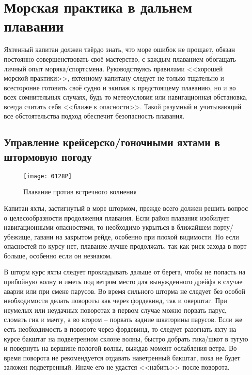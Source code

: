 \chapter{Морская практика в дальнем плавании}

Яхтенный капитан должен твёрдо знать, что море ошибок не прощает, обязан постоянно совершенствовать своё мастерство, с каждым плаванием обогащать личный опыт моряка\-/спортсмена. Руководствуясь правилами <<хорошей морской практики>>, яхтенному капитану следует не только тщательно и всесторонне готовить своё судно и экипаж к предстоящему плаванию, но и во всех сомнительных случаях, будь то метеоусловия или навигационная обстановка, всегда считать себя <<ближе к опасности>>. Такой разумный и учитывающий все обстоятельства подход обеспечит безопасность плавания.

\section{Управление крейсерско\-/гоночными яхтами в штормовую погоду}

\begin{figure*}[htb]
  \centering{}
  \texttt{[image: 0128P]}
  \caption{Плавание против встречного волнения}
  \label{fig:128}
\end{figure*}

Капитан яхты, застигнутый в море штормом, прежде всего должен решить вопрос о целесообразности продолжения плавания. Если район плавания изобилует навигационными опасностями, то необходимо укрыться в ближайшем порту\-/убежище, гавани на закрытом рейде, особенно при плохой видимости. Но если опасностей по курсу нет, плавание лучше продолжать, так как риск захода в порт больше, особенно если он незнаком.

В шторм курс яхты следует прокладывать дальше от берега, чтобы не попасть на прибойную волну и иметь под ветром место для вынужденного дрейфа в случае аварии или при смене парусов. Во время сильного шторма не следует без особой необходимости делать повороты как через фордевинд, так и оверштаг. При неумелых или неудачных поворотах в первом случае можно порвать парус, сломать гик и мачту, а во втором \--- порвать задние шкаторины парусов. Если же есть необходимость в повороте через фордевинд, то следует разогнать яхту на курсе бакштаг на подветренном склоне волны, быстро добрать гика\-/шкот в тугую и повернуть на вершине пологой волны, выждав момент ослабления ветра. Во время поворота не рекомендуется отдавать наветренный бакштаг, пока не будет заложен подветренный. Иначе его не удастся <<набить>> после поворота.

